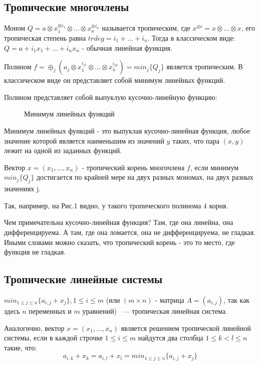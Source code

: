 \documentclass[russian]{lecture-notes}
\begin{document}
\subsection{Тропические многочлены}

\begin{Definition}
	Моном $Q=a\otimes x_1^{\otimes i_1}\otimes\ldots\otimes x_n^{\otimes i_n}$ называется тропическим, где $x^{\otimes i}=x\otimes\ldots\otimes x$, его тропическая степень равна $trdeg=i_1+\ldots+i_n$. Тогда в классическом виде: $Q=a+i_1x_1+\ldots+i_nx_n$ - обычная линейная функция.
	\end{Definition}
\begin{Definition}
	Полином $f=\oplus_j(a_j\otimes x_1^{i_{j1}}\otimes\ldots\otimes x_n^{i_{jn}})=min_j\{Q_j\}$ является тропическим. В классическом виде он представляет собой минимум линейных функций.
		\end{Definition}


 Полином представляет собой выпуклую кусочно-линейную функцию:


\begin{figure}[h!]
\caption{Минимум линейных функций}
\end{figure}
\begin{Definition}
	Минимум линейных функций - это выпуклая кусочно-линейная функция, любое значение которой является наименьшим из значений $y$ таких, что пара $(x,y)$ лежит на одной из заданных функций.\\
	\end{Definition}
\begin{Definition}
Вектор $x=(x_1,\ldots, x_n)$ - тропический корень многочлена $f$, если минимум $min_j\{Q_j\}$ достигается по крайней мере на двух разных мономах, на двух разных значениях j.
\end{Definition}
Так, например, на Рис.1 видно, у такого тропического полинома 4 корня.

Чем примечательна кусочно-линейная функция? Там, где она линейна, она дифференцируема. А там, где она ломается, она не дифференцируема, не гладкая. Иными словами можно сказать, что тропический корень - это то место, где функция не гладкая.
\subsection{ Тропические линейные системы}

\begin{Definition}
	$min_{1\le j\le n}\{a_{i,j}+x_j\}, 1\le i\le m$ (или $(m\times n)$ - матрица $A=(a_{i,j})$, так как здесь $n$ переменных и $m$ уравнений) ~--- тропическая линейная система.
	\end{Definition}
\begin{Definition}
	Аналогично, вектор $x=(x_1,\ldots, x_n)$ является решением тропической линейной системы, если в каждой строчке $1\le i\le m$ найдутся два столбца $1\le k<l\le n$ такие, что:
	\[
	a_{i,k}+x_k=a_{i,l}+x_l=min_{1\le j\le n}\{a_{i,j}+x_j\}
	\]
	\end{Definition}
\end{document}
